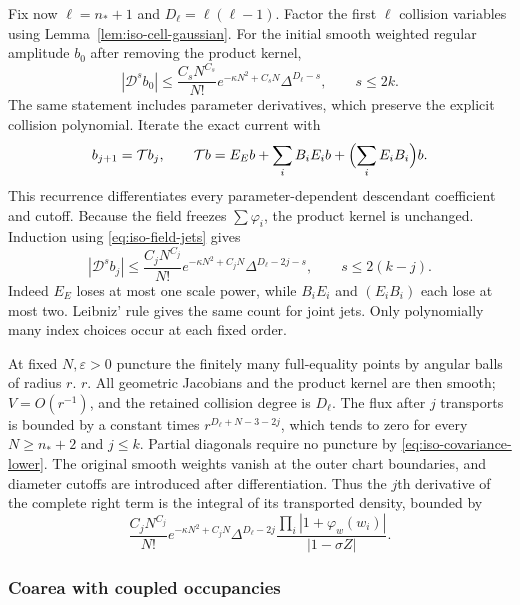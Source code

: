 \documentclass[11pt]{article}
\numberwithin{equation}{section}
\theoremstyle{definition}
\newcommand{\eps}{\varepsilon}
\begin{document}
Fix now $\ell=n_*+1$ and $D_\ell=\ell(\ell-1)$.
Factor the first $\ell$ collision variables using
Lemma~\ref{lem:iso-cell-gaussian}.  For the initial smooth weighted
regular amplitude $b_0$ after removing the product kernel,
\[
 |\mathcal D^s b_0|
 \le\frac{C_sN^{C_s}}{N!}e^{-\kappa N^2+C_sN}
                     \Delta^{D_\ell-s},\qquad s\le2k.
\]
The same statement includes parameter derivatives, which preserve the
explicit collision polynomial.  Iterate the exact current with
\begin{equation}\label{eq:iso-transport-recurrence}
 b_{j+1}=\mathcal T b_j,\qquad
 \mathcal T b=E_{{E}}b+\sum_iB_iE_i b
                              +\Bigl(\sum_iE_iB_i\Bigr)b.
\end{equation}
This recurrence differentiates every parameter-dependent descendant
coefficient and cutoff.  Because the field freezes $\sum\varphi_i$,
the product kernel is unchanged.  Induction using
\eqref{eq:iso-field-jets} gives
\begin{equation}\label{eq:iso-transported-amplitude}
 |\mathcal D^s b_j|
 \le\frac{C_jN^{C_j}}{N!}e^{-\kappa N^2+C_jN}
              \Delta^{D_\ell-2j-s},\qquad s\le2(k-j).
\end{equation}
Indeed $E_{{E}}$ loses at most one scale power, while
$B_iE_i$ and $(E_iB_i)$ each lose at most two.  Leibniz' rule gives
the same count for joint jets.  Only polynomially many index choices
occur at each fixed order.

At fixed $N,\eps>0$ puncture the finitely many full-equality
points by angular balls of radius $r$.
$r$.  All geometric Jacobians and the product kernel are then smooth;
$V=O(r^{-1})$, and the retained collision degree is $D_\ell$.
The flux after $j$ transports is bounded by a constant times
$r^{D_\ell+N-3-2j}$, which tends to zero for every $N\ge n_*+2$
and $j\le k$.  Partial diagonals require no puncture by
\eqref{eq:iso-covariance-lower}. The original smooth weights vanish
at the outer chart boundaries, and diameter cutoffs are introduced
after differentiation. Thus the $j$th derivative of the complete
right term is the integral of its transported density, bounded by
\begin{equation}\label{eq:iso-transported-density}
 \frac{C_jN^{C_j}}{N!}e^{-\kappa N^2+C_jN}
 \Delta^{D_\ell-2j}
 \frac{\prod_i|1+\varphi_w(w_i)|}{|1-\sigma Z|}.
\end{equation}

\subsubsection{Coarea with coupled occupancies}
\end{document}
